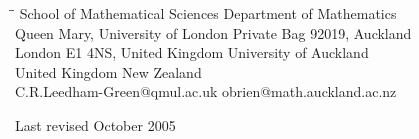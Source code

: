 \documentclass[12pt]{article}
\begin{document}
\begin{tabbing}
\=\hspace{70mm}\=\kill
\>School of Mathematical Sciences \>Department of Mathematics    \\
\>Queen Mary, University of London \>Private Bag 92019, Auckland \\
\>London E1 4NS, United Kingdom   \>University of Auckland     \\
\>United Kingdom                  \> New Zealand     \\
\> C.R.Leedham-Green@qmul.ac.uk   \> obrien@math.auckland.ac.nz
\end{tabbing}

\vspace*{2mm}
\noindent 
Last revised October 2005
\end{document}
